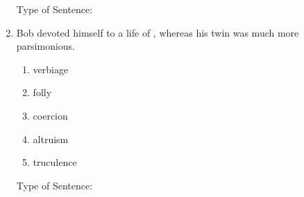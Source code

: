 \begin{enumerate}
Type of Sentence:\hrulefill

\bigskip
\item Bob devoted himself to a life of \longline, whereas his twin was much more parsimonious. 
\begin{enumerate}[label=(\Alph*)]
\item verbiage
\item folly
\item coercion
\item altruism 
\item truculence
\end{enumerate}

Type of Sentence:\hrulefill

\end{enumerate}





